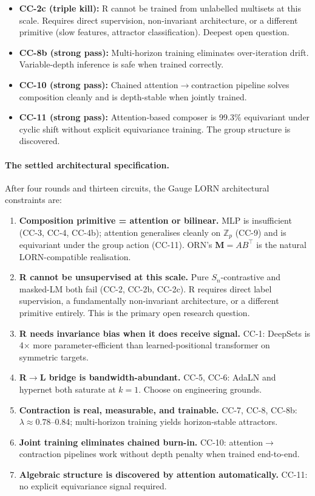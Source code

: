 \documentclass[10pt, twocolumn, a4paper]{article}
\newcommand{\Sn}{S_n}
\newcommand{\M}{\mathbf{M}}
\begin{document}
\begin{itemize}[nosep]
\item \textbf{CC-2c (triple kill):} R cannot be trained from unlabelled multisets at this scale. Requires direct supervision, non-invariant architecture, or a different primitive (slow features, attractor classification). Deepest open question.
\item \textbf{CC-8b (strong pass):} Multi-horizon training eliminates over-iteration drift. Variable-depth inference is safe when trained correctly.
\item \textbf{CC-10 (strong pass):} Chained attention$\to$contraction pipeline solves composition cleanly and is depth-stable when jointly trained.
\item \textbf{CC-11 (strong pass):} Attention-based composer is 99.3\% equivariant under cyclic shift without explicit equivariance training. The group structure is discovered.
\end{itemize}

\paragraph{The settled architectural specification.}
After four rounds and thirteen circuits, the Gauge LORN architectural constraints are:

\begin{enumerate}[nosep,leftmargin=*]
\item \textbf{Composition primitive = attention or bilinear.} MLP is insufficient (CC-3, CC-4, CC-4b); attention generalises cleanly on $\mathbb{Z}_p$ (CC-9) and is equivariant under the group action (CC-11). ORN's $\M = AB^\top$ is the natural LORN-compatible realisation.
\item \textbf{R cannot be unsupervised at this scale.} Pure $\Sn$-contrastive and masked-LM both fail (CC-2, CC-2b, CC-2c). R requires direct label supervision, a fundamentally non-invariant architecture, or a different primitive entirely. This is the primary open research question.
\item \textbf{R needs invariance bias when it does receive signal.} CC-1: DeepSets is 4$\times$ more parameter-efficient than learned-positional transformer on symmetric targets.
\item \textbf{R$\to$L bridge is bandwidth-abundant.} CC-5, CC-6: AdaLN and hypernet both saturate at $k=1$. Choose on engineering grounds.
\item \textbf{Contraction is real, measurable, and trainable.} CC-7, CC-8, CC-8b: $\lambda \approx 0.78$--0.84; multi-horizon training yields horizon-stable attractors.
\item \textbf{Joint training eliminates chained burn-in.} CC-10: attention$\to$contraction pipelines work without depth penalty when trained end-to-end.
\item \textbf{Algebraic structure is discovered by attention automatically.} CC-11: no explicit equivariance signal required.
\end{enumerate}
\end{document}
